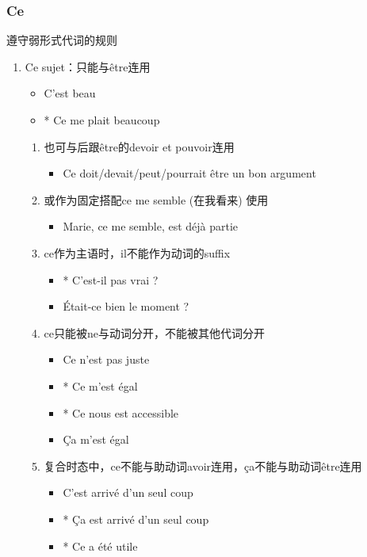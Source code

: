 \documentclass[UTF8]{report}
\begin{document}
\subsubsection{Ce}
遵守弱形式代词的规则
\begin{enumerate}
    \item Ce sujet：只能与être连用
    \begin{itemize}
        \item C’est beau
        \item * Ce me plait beaucoup
    \end{itemize}
    \begin{enumerate}
        \item 也可与后跟être的devoir et pouvoir连用
        \begin{itemize}
            \item Ce doit/devait/peut/pourrait être un bon argument
        \end{itemize}
        \item 或作为固定搭配ce me semble (在我看来) 使用
        \begin{itemize}
            \item Marie, ce me semble, est déjà partie
        \end{itemize}
        \item ce作为主语时，il不能作为动词的suffix
        \begin{itemize}
            \item * C’est-il pas vrai ?
            \item Était-ce bien le moment ?
        \end{itemize}
        \item ce只能被ne与动词分开，不能被其他代词分开
        \begin{itemize}
            \item Ce n’est pas juste
            \item * Ce m’est égal
            \item * Ce nous est accessible
            \item Ça m’est égal
        \end{itemize}
        \item 复合时态中，ce不能与助动词avoir连用，ça不能与助动词être连用
        \begin{itemize}
            \item C’est arrivé d’un seul coup
            \item * Ça est arrivé d’un seul coup
            \item * Ce a été utile

\end{itemize}
\end{enumerate}
\end{enumerate}
\end{document}
